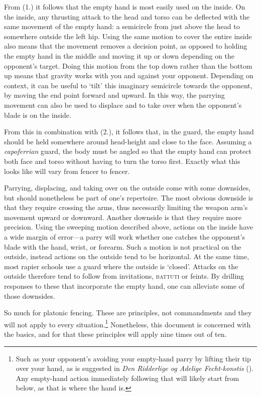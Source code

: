 \documentclass[article, 12pt, a4paper]{memoir}
\begin{document}
From (1.) it follows that the empty hand is most easily used on the inside.
On the inside, any thrusting attack to the head and torso can be deflected with the same movement of the empty hand: a semicircle from just above the head to somewhere outside the left hip.
Using the same motion to cover the entire inside also means that the movement removes a decision point, as opposed to holding the empty hand in the middle and moving it up or down depending on the opponent's target.
Doing this motion from the top down rather than the bottom up means that gravity works with you and against your opponent.
Depending on context, it can be useful to `tilt' this imaginary semicircle towards the opponent, by moving the end point forward and upward.
In this way, the parrying movement can also be used to displace and to take over when the opponent's blade is on the inside.

From this in combination with (2.), it follows that, in the guard, the empty hand should be held somewhere around head-height and close to the face.
Assuming a \emph{capoferrian} guard, the body must be angled so that the empty hand can protect both face and torso without having to turn the torso first.
Exactly what this looks like will vary from fencer to fencer.

Parrying, displacing, and taking over on the outside come with some downsides, but should nonetheless be part of one's repertoire.
The most obvious downside is that they require crossing the arms, thus necessarily limiting the weapon arm's movement upward or downward.
Another downside is that they require more precision.
Using the sweeping motion described above, actions on the inside have a wide margin of error---a parry will work whether one catches the opponent's blade with the hand, wrist, or forearm.
Such a motion is not practical on the outside, instead actions on the outside tend to be horizontal.
At the same time, most rapier schools use a guard where the outside is `closed'.
Attacks on the outside therefore tend to follow from invitations, \textsc{battuti} or feints.
By drilling responses to these that incorporate the empty hand, one can alleviate some of those downsides.

\bigbreak
So much for platonic fencing.
These are principles, not commandments and they will not apply to every situation.\footnote{Such as your opponent's avoiding your empty-hand parry by lifting their tip over your hand, as is suggested in \emph{Den Ridderlige og Adelige Fecht-konstis} (\citeyear{a.RidderligeOcAdelige1646}). Any empty-hand action immediately following that will likely start from below, as that is where the hand is.}
Nonetheless, this document is concerned with the basics, and for that these principles will apply nine times out of ten.
\end{document}
